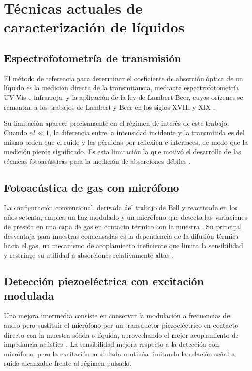 \section{Técnicas actuales de caracterización de líquidos}
\label{sec:tecnicas_actuales}

\subsection*{Espectrofotometría de transmisión}

El método de referencia para determinar el coeficiente de absorción
óptica de un líquido es la medición directa de la transmitancia,
mediante espectrofotometría UV-Vis o infrarroja, y la aplicación de
la ley de Lambert-Beer, cuyos orígenes se remontan a los trabajos
de Lambert y Beer en los siglos XVIII y XIX \cite{Marin2008}.

Su limitación aparece precisamente en el régimen de interés de este
trabajo. Cuando $\alpha l \ll 1$, la diferencia entre la intensidad
incidente y la transmitida es del mismo orden que el ruido y las
pérdidas por reflexión e interfaces, de modo que la medición pierde
significado. Es esta limitación la que motivó el desarrollo de las
técnicas fotoacústicas para la medición de absorciones débiles
\cite{PatelTam1981}.

\subsection*{Fotoacústica de gas con micrófono}

La configuración convencional, derivada del trabajo de Bell y
reactivada en los años setenta, emplea un haz modulado y un
micrófono que detecta las variaciones de presión en una capa de gas
en contacto térmico con la muestra
\cite{RosencwaigGersho1976,PatelTam1981}. Su principal desventaja
para muestras condensadas es la dependencia de la difusión térmica
hacia el gas, un mecanismo de acoplamiento ineficiente que limita
la sensibilidad y restringe su utilidad a absorciones
relativamente altas \cite{PatelTam1981}.

\subsection*{Detección piezoeléctrica con excitación modulada}

Una mejora intermedia consiste en conservar la modulación a
frecuencias de audio pero sustituir el micrófono por un transductor
piezoeléctrico en contacto directo con la muestra sólida o líquida,
aprovechando el mejor acoplamiento de impedancia acústica
\cite{PatelTam1981}. La sensibilidad mejora respecto a la
detección con micrófono, pero la excitación modulada continúa
limitando la relación señal a ruido alcanzable frente al régimen
pulsado.

